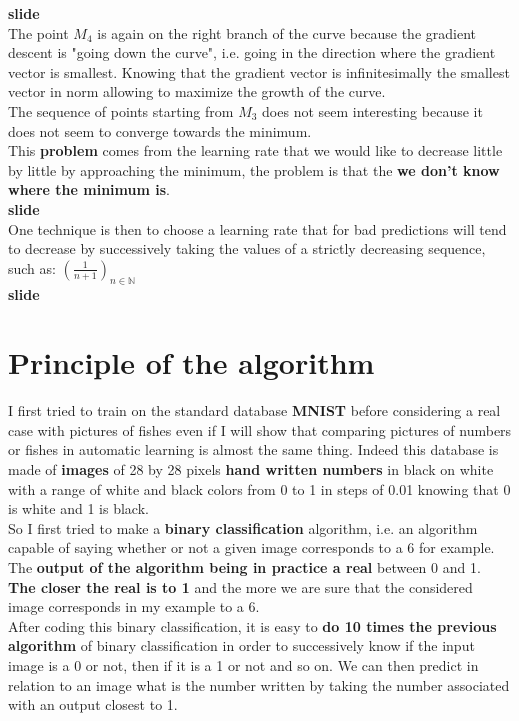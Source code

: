 \documentclass{article}
\begin{document}
	\textbf{slide}\\
				
		The point $M_4$ is again on the right branch of the curve because the gradient descent is "going down the curve", i.e. going in the direction where the gradient vector is smallest. Knowing that the gradient vector is infinitesimally the smallest vector in norm allowing to maximize the growth of the curve.\\
		The sequence of points starting from $M_3$ does not seem interesting because it does not seem to converge towards the minimum.\\
	
		This \textbf{problem} comes from the learning rate that we would like to decrease little by little by approaching the minimum, the problem is that the \textbf{we don't know where the minimum is}.\\
		
		\textbf{slide}\\
		
		One technique is then to choose a learning rate that for bad predictions will tend to decrease by successively taking the values of a strictly decreasing sequence, such as: $\left(\frac{1}{n + 1}\right)_{n \in \mathbb{N}}$\\
		
		\textbf{slide}\\
		
	\section{Principle of the algorithm}
	
		I first tried to train on the standard database \textbf{MNIST} before considering a real case with pictures of fishes even if I will show that comparing pictures of numbers or fishes in automatic learning is almost the same thing. Indeed this database is made of \textbf{images} of 28 by 28 pixels \textbf{hand written numbers} in black on white with a range of white and black colors from 0 to 1 in steps of 0.01 knowing that 0 is white and 1 is black.\\
		So I first tried to make a \textbf{binary classification} algorithm, i.e. an algorithm capable of saying whether or not a given image corresponds to a 6 for example. The \textbf{output of the algorithm being in practice a real} between 0 and 1. \textbf{The closer the real is to 1} and the more we are sure that the considered image corresponds in my example to a 6.\\
		After coding this binary classification, it is easy to \textbf{do 10 times the previous algorithm} of binary classification in order to successively know if the input image is a 0 or not, then if it is a 1 or not and so on. We can then predict in relation to an image what is the number written by taking the number associated with an output closest to 1.\\
	
\end{document}
